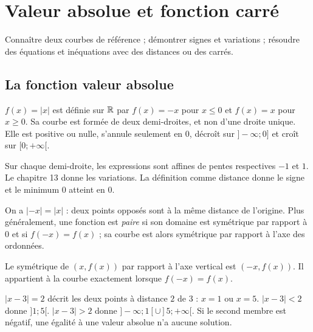 \documentclass[../cours_2de.tex]{subfiles}
\begin{document}
\setcounter{chapter}{13}
\chapter{Valeur absolue et fonction carré}
\label{sec:ch14}
\begin{objectif}
Connaître deux courbes de référence ; démontrer signes et variations ; résoudre des équations et inéquations avec des distances ou des carrés.
\end{objectif}
\section{La fonction valeur absolue}
$f(x)=|x|$ est définie sur $\mathbb{R}$ par $f(x)=-x$ pour $x\leq0$ et $f(x)=x$ pour $x\geq0$.
Sa courbe est formée de deux demi-droites, et non d'une droite unique.
Elle est positive ou nulle, s'annule seulement en $0$, décroît sur $]-\infty;0]$ et croît sur $[0;+\infty[$.
\begin{demonstration}
Sur chaque demi-droite, les expressions sont affines de pentes respectives $-1$ et $1$. Le chapitre 13 donne les variations. La définition comme distance donne le signe et le minimum $0$ atteint en $0$.
\end{demonstration}
On a $|-x|=|x|$ : deux points opposés sont à la même distance de l'origine.
Plus généralement, une fonction est \emph{paire} si son domaine est symétrique par rapport à $0$ et si $f(-x)=f(x)$ ; sa courbe est alors symétrique par rapport à l'axe des ordonnées.
\begin{demonstration}
Le symétrique de $(x,f(x))$ par rapport à l'axe vertical est $(-x,f(x))$.
Il appartient à la courbe exactement lorsque $f(-x)=f(x)$.
\end{demonstration}
\begin{exemple}
$|x-3|=2$ décrit les deux points à distance $2$ de $3$ : $x=1$ ou $x=5$.
$|x-3|<2$ donne $]1;5[$.
$|x-3|>2$ donne $]-\infty;1[\cup]5;+\infty[$.
Si le second membre est négatif, une égalité à une valeur absolue n'a aucune solution.
\end{exemple}
\end{document}
